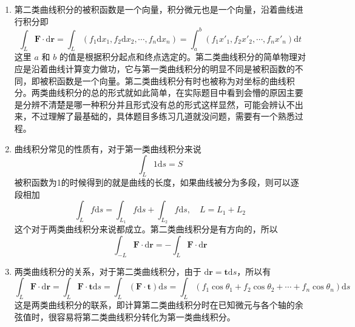 \begin{enumerate}
    \item 第二类曲线积分的被积函数是一个向量，积分微元也是一个向量，沿着曲线进行积分即
    \[
        \int _L \mathbf{F} \cdot \mathrm{d} \mathbf{r} = \int _L (f_1 \mathrm{d}x_1, f_2\mathrm{d}x_2, \cdots, f_n \mathrm{d}x_n) = \int _a^b (f_1 x'_1, f_2 x'_2, \cdots, f_n x'_n)\mathrm{d}t
    \]
    这里 $a$ 和 $b$ 的值是根据积分起点和终点选定的。第二类曲线积分的简单物理对应是沿着曲线计算变力做功，它与第一类曲线积分的明显不同是被积函数的不同，即被积函数是一个向量。第二类曲线积分有时也被称为对坐标的曲线积分。两类曲线积分的总的形式就如此简单，在实际题目中看到会懵的原因主要是分辨不清楚是哪一种积分并且形式没有总的形式这样显然，可能会辨认不出来，不过理解了最基础的，具体题目多练习几道就没问题，需要有一个熟悉过程。

    \item 曲线积分常见的性质有，对于第一类曲线积分来说
    \[
        \int _L 1 \mathrm{d}s = S
    \]
    被积函数为1的时候得到的就是曲线的长度，如果曲线被分为多段，则可以逐段相加
    \[
        \int _L f \mathrm{d} s = \int _{L_1} f \mathrm{d}s + \int _{L_2} f \mathrm{d}s, \quad L = L_1 + L_2
    \]
    这个对于两类曲线积分来说都成立。第二类曲线积分是有方向的，所以
    \[
        \int_{-L}\mathbf{F}\cdot  \mathrm{d} \mathbf{r}=-\int_L\mathbf{F}\cdot 
     \mathrm{d} \mathbf{r}
    \]

    \item 两类曲线积分的关系，对于第二类曲线积分，由于 $\mathrm{d} \mathbf{r} = \mathbf{t} \mathrm{d}s$，所以有
    \[
        \int _L \mathbf{F} \cdot \mathrm{d} \mathbf{r} = \int _L \mathbf{F} \cdot \mathbf{t} \mathrm{d}s = \int _L (\mathbf{F} \cdot \mathbf{t})\mathrm{d}s = \int _L (f_1 \cos \theta _1+ f_2 \cos \theta _2 + \cdots + f_n \cos \theta _n)\mathrm{d}s
    \]
    这是两类曲线积分的联系，即计算第二类曲线积分时在已知微元与各个轴的余弦值时，很容易将第二类曲线积分转化为第一类曲线积分。
\end{enumerate}

